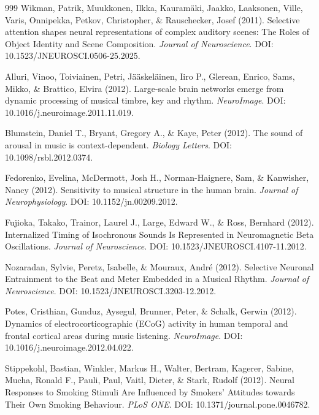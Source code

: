 \documentclass[9pt,onecolumn]{article}
\begin{document}
\begin{thebibliography}{999}
Wikman, Patrik, Muukkonen, Ilkka, Kauramäki, Jaakko, Laaksonen, Ville, Varis, Onnipekka, Petkov, Christopher, \& Rauschecker, Josef (2011). Selective attention shapes neural representations of complex auditory scenes: The Roles of Object Identity and Scene Composition. \textit{Journal of Neuroscience}. DOI: 10.1523/JNEUROSCI.0506-25.2025.

Alluri, Vinoo, Toiviainen, Petri, Jääskeläinen, Iiro P., Glerean, Enrico, Sams, Mikko, \& Brattico, Elvira (2012). Large-scale brain networks emerge from dynamic processing of musical timbre, key and rhythm. \textit{NeuroImage}. DOI: 10.1016/j.neuroimage.2011.11.019.

Blumstein, Daniel T., Bryant, Gregory A., \& Kaye, Peter (2012). The sound of arousal in music is context-dependent. \textit{Biology Letters}. DOI: 10.1098/rsbl.2012.0374.

Fedorenko, Evelina, McDermott, Josh H., Norman-Haignere, Sam, \& Kanwisher, Nancy (2012). Sensitivity to musical structure in the human brain. \textit{Journal of Neurophysiology}. DOI: 10.1152/jn.00209.2012.

Fujioka, Takako, Trainor, Laurel J., Large, Edward W., \& Ross, Bernhard (2012). Internalized Timing of Isochronous Sounds Is Represented in Neuromagnetic Beta Oscillations. \textit{Journal of Neuroscience}. DOI: 10.1523/JNEUROSCI.4107-11.2012.

Nozaradan, Sylvie, Peretz, Isabelle, \& Mouraux, André (2012). Selective Neuronal Entrainment to the Beat and Meter Embedded in a Musical Rhythm. \textit{Journal of Neuroscience}. DOI: 10.1523/JNEUROSCI.3203-12.2012.

Potes, Cristhian, Gunduz, Aysegul, Brunner, Peter, \& Schalk, Gerwin (2012). Dynamics of electrocorticographic (ECoG) activity in human temporal and frontal cortical areas during music listening. \textit{NeuroImage}. DOI: 10.1016/j.neuroimage.2012.04.022.

Stippekohl, Bastian, Winkler, Markus H., Walter, Bertram, Kagerer, Sabine, Mucha, Ronald F., Pauli, Paul, Vaitl, Dieter, \& Stark, Rudolf (2012). Neural Responses to Smoking Stimuli Are Influenced by Smokers' Attitudes towards Their Own Smoking Behaviour. \textit{PLoS ONE}. DOI: 10.1371/journal.pone.0046782.


\end{thebibliography}
\end{document}
